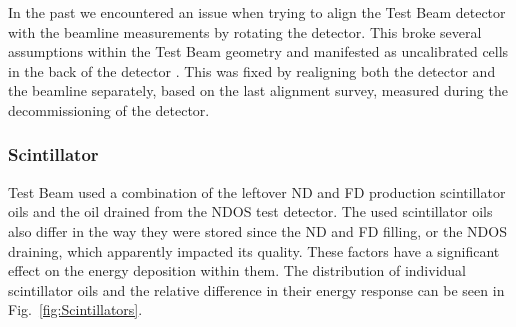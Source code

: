 In the past we encountered an issue when trying to align the Test Beam detector with the beamline measurements by rotating the detector. This broke several assumptions within the Test Beam geometry \cite{NOvA-doc-58388} and manifested as uncalibrated cells in the back of the detector \cite{NOvA-doc-57516}. This was fixed by realigning both the detector and the beamline separately, based on the last alignment survey, measured during the decommissioning of the detector.


\subsubsection*{Scintillator}

Test Beam used a combination of the leftover \gls{ND} and \gls{FD} production scintillator oils and the oil drained from the \gls{NDOS} test detector. The used scintillator oils also differ in the way they were stored since the \gls{ND} and \gls{FD} filling, or the \gls{NDOS} draining, which apparently impacted its quality. These factors have a significant effect on the energy deposition within them. The distribution of individual scintillator oils and the relative difference in their energy response can be seen in Fig.~\ref{fig:Scintillators}.


